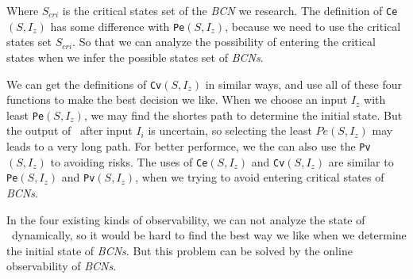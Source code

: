 Where $S_{cri}$ is the critical states set of the {\em BCN} we research. The definition of {\tt Ce}$(S, I_z)$ has some difference with {\tt Pe}$(S, I_z)$, because we need to use the critical states set $S_{cri}$. So that  we can analyze the possibility of entering the  critical states when we infer the possible states set of {\em BCNs}.

We can get the definitions of {\tt Cv}$(S, I_z)$ in similar ways, and use all of these four functions to make the best decision we like. When we choose an input $I_z$ with least {\tt Pe}$(S, I_z)$, we may find the shortes path to determine the initial state. But the output of \BCNs\ after input $I_i$ is uncertain, so selecting the least $Pe(S, I_z)$ may leads to a very long path. For better performce, we the can also use the {\tt Pv}$(S, I_z)$ to avoiding risks. The uses of {\tt Ce}$(S, I_z)$ and {\tt Cv}$(S, I_z)$ are similar to {\tt Pe}$(S, I_z)$ and {\tt Pv}$(S, I_z)$, when we trying to avoid entering critical states of {\em BCNs}.

In the four existing kinds of observability, we can not analyze the state of \BCNs\ dynamically, so it would be hard to find the best way we like when we determine the initial state of {\em BCNs}. But this problem can be solved by the online observability of {\em BCNs}.